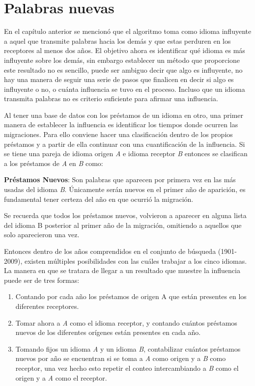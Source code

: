 \chapter{Palabras nuevas}
En el capítulo anterior se mencionó que el algoritmo toma como  idioma
influyente a aquel que transmite palabras hacia los demás y que estas perduren
en los receptores al menos dos años.   El objetivo ahora es identificar qué
idioma es más influyente sobre los demás, sin embargo establecer un método que
proporcione este resultado no es sencillo,  puede ser ambiguo decir que algo es
influyente, no hay una manera de seguir una serie de pasos que finalicen en
decir si algo es influyente o no,  o cuánta influencia se tuvo en el proceso.
Incluso que un idioma transmita palabras no es criterio suficiente para afirmar
una influencia.  

Al tener una base de datos  con los préstamos de un idioma en otro,  una primer
manera de establecer la influencia es  identificar los tiempos donde ocurren
las migraciones.  Para ello conviene hacer una clasificación dentro de los
propios préstamos y a partir de ella  continuar con una cuantificación de la
influencia.  Si se tiene una pareja de idioma origen \textit{A} e idioma
receptor \textit{B} entonces se clasifican a los préstamos de \textit{A} en
\textit{B} como:

\textbf{Préstamos Nuevos}: Son palabras que aparecen por primera vez en las más
usadas del idioma \textit{B}.  Únicamente serán nuevos en el primer año de
aparición,  es fundamental tener certeza del año en que ocurrió la migración. 

Se recuerda que todos los préstamos nuevos, volvieron a aparecer en alguna
lista del idioma B posterior al primer año de la migración, omitiendo a
aquellos que solo aparecieron una vez. 

Entonces dentro de los años comprendidos en el conjunto de búsqueda
(1901-2009), existen múltiples posibilidades con las cuáles trabajar a los
cinco idiomas. La manera en que se tratara de llegar a un resultado que muestre
la influencia puede ser de tres formas:
\begin{enumerate}
\item Contando por cada año los préstamos de origen A que están presentes en
los diferentes receptores.
\item Tomar ahora a \textit{A} como el idioma receptor, y contando cuántos
préstamos nuevos de los diferentes orígenes están presentes en cada año. 
\item Tomando fijos un idioma \textit{A} y un idioma \textit{B},  contabilizar
cuántos préstamos nuevos por año se encuentran si se toma a \textit{A} como
origen y a \textit{B} como receptor,  una vez hecho esto  repetir el conteo
intercambiando a \textit{B} como el origen y a \textit{A} como el receptor. 
\end{enumerate}


